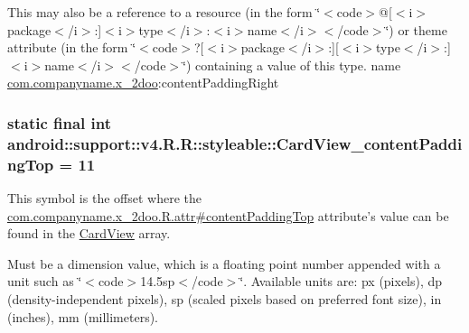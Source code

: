 This may also be a reference to a resource (in the form \char`\"{}$<$code$>$@\mbox{[}$<$i$>$package$<$/i$>$:\mbox{]}$<$i$>$type$<$/i$>$:$<$i$>$name$<$/i$>$$<$/code$>$\char`\"{}) or theme attribute (in the form \char`\"{}$<$code$>$?\mbox{[}$<$i$>$package$<$/i$>$:\mbox{]}\mbox{[}$<$i$>$type$<$/i$>$:\mbox{]}$<$i$>$name$<$/i$>$$<$/code$>$\char`\"{}) containing a value of this type.  name \hyperlink{namespacecom_1_1companyname_1_1x__2doo}{com.companyname.x\_\-2doo}:contentPaddingRight \hypertarget{classandroid_1_1support_1_1v4_1_1_r_1_1styleable_4a2edd3e314f6cd115aba1e91f596d81}{
\subsubsection[{CardView\_\-contentPaddingTop}]{\setlength{\rightskip}{0pt plus 5cm}static final int android::support::v4.R.R::styleable::CardView\_\-contentPaddingTop = 11}}
\label{classandroid_1_1support_1_1v4_1_1_r_1_1styleable_4a2edd3e314f6cd115aba1e91f596d81}


This symbol is the offset where the \hyperlink{classcom_1_1companyname_1_1x__2doo_1_1_r_1_1attr_ebd5134a2d8798a2bf3b90593acb918d}{com.companyname.x\_\-2doo.R.attr\#contentPaddingTop} attribute's value can be found in the \hyperlink{classandroid_1_1support_1_1v4_1_1_r_1_1styleable_4fcc6453aa91deadd7072add3aee5e56}{CardView} array.

Must be a dimension value, which is a floating point number appended with a unit such as \char`\"{}$<$code$>$14.5sp$<$/code$>$\char`\"{}. Available units are: px (pixels), dp (density-independent pixels), sp (scaled pixels based on preferred font size), in (inches), mm (millimeters). 

